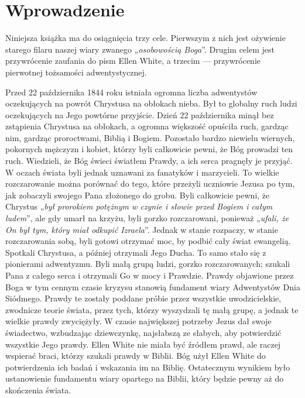  \chapter*{Wprowadzenie}

Niniejsza książka ma do osiągnięcia trzy cele. Pierwszym z nich jest ożywienie starego filaru naszej wiary zwanego „\textit{osobowością Boga}”. Drugim celem jest przywrócenie zaufania do pism Ellen White, a trzecim — przywrócenie pierwotnej tożsamości adwentystycznej.

Przed 22 października 1844 roku istniała ogromna liczba adwentystów oczekujących na powrót Chrystusa na obłokach nieba. Był to globalny ruch ludzi oczekujących na Jego powtórne przyjście. Dzień 22 października minął bez zstąpienia Chrystusa na obłokach, a ogromna większość opuściła ruch, gardząc nim, gardząc proroctwami, Biblią i Bogiem. Pozostało bardzo niewielu wiernych, pokornych mężczyzn i kobiet, którzy byli całkowicie pewni, że Bóg prowadzi ten ruch. Wiedzieli, że Bóg świeci światłem Prawdy, a ich serca pragnęły je przyjąć. W oczach świata byli jednak uznawani za fanatyków i marzycieli. To wielkie rozczarowanie można porównać do tego, które przeżyli uczniowie Jezusa po tym, jak zobaczyli swojego Pana złożonego do grobu. Byli całkowicie pewni, że Chrystus „\textit{był prorokiem potężnym w czynie i słowie przed Bogiem i całym ludem}”, ale gdy umarł na krzyżu, byli gorzko rozczarowani, ponieważ „\textit{ufali, że On był tym, który miał odkupić Izraela}”. Jednak w stanie rozpaczy, w stanie rozczarowania sobą, byli gotowi otrzymać moc, by podbić cały świat ewangelią. Spotkali Chrystusa, a później otrzymali Jego Ducha. To samo stało się z pionierami adwentyzmu. Byli małą grupą ludzi, gorzko rozczarowanych; szukali Pana z całego serca i otrzymali Go w mocy i Prawdzie. Prawdy objawione przez Boga w tym cennym czasie kryzysu stanowią fundament wiary Adwentystów Dnia Siódmego. Prawdy te zostały poddane próbie przez wszystkie uwodzicielskie, zwodnicze teorie świata, przez tych, którzy wyszydzali tę małą grupę, a jednak te wielkie prawdy zwyciężyły. W czasie największej potrzeby Jezus dał swoje świadectwo, wzbudzając dziewczynkę, najsłabszą ze słabych, aby potwierdzić wszystkie Jego prawdy. Ellen White nie miała być źródłem prawd, ale raczej wspierać braci, którzy szukali prawdy w Biblii. Bóg użył Ellen White do potwierdzenia ich badań i wskazania im na Biblię. Ostatecznym wynikiem było ustanowienie fundamentu wiary opartego na Biblii, który będzie pewny aż do skończenia świata.


